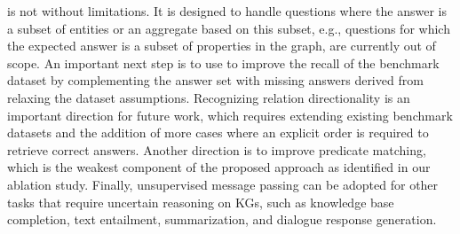 \OurApproach{} is not without limitations. 
It is designed to handle questions where the answer is a subset of entities or an aggregate based on this subset, e.g., questions for which the expected answer is a subset of properties in the graph, are currently out of scope.
An important next step is to use \OurApproach{} to improve the recall of the benchmark dataset by complementing the answer set with missing answers derived from relaxing the dataset assumptions.
Recognizing relation directionality is an important direction for future work, which requires extending existing benchmark datasets and the addition of more cases where an explicit order is required to retrieve correct answers.
Another direction is to improve predicate matching, which is the weakest component of the proposed approach as identified in our ablation study.
Finally, unsupervised message passing can be adopted for other tasks that require uncertain reasoning on KGs, such as knowledge base completion, text entailment, summarization, and dialogue response generation.
